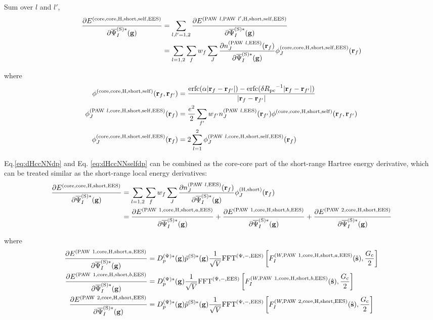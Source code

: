 \documentclass[paper=a4, fontsize=11pt]{article} %
\numberwithin{equation}{section} %
\numberwithin{figure}{section} %
\numberwithin{table}{section} %
\newcommand{\p}{\partial}
\newcommand{\bg}{{\bf{g}}}
\newcommand{\br}{{\bf{r}}}
\newcommand{\hs}{{\hat{\bf{s}}}}
\newcommand{\rS}{{\mathrm{S}}}
\newcommand{\rEES}{{\mathrm{EES}}}
\newcommand{\rcore}{{\mathrm{core}}}
\newcommand{\rself}{{\mathrm{self}}}
\newcommand{\rshort}{{\mathrm{short}}}
\newcommand{\rerfc}{{\mathrm{erfc}}}
\newcommand{\rP}{{\mathrm{PAW}}}
\newcommand{\rH}{{\mathrm{H}}}
\newcommand{\psigsc}{{\overline \Psi_I^{(\rS)*}(\bg)}}
\newcommand{\hGc}{{\frac{G_{\mathrm{c}}}{2}}}
\newcommand{\Rpc}{{R_{\mathrm{pc}}}}
\newcommand{\Dpgc}{{D^{(\Psi)*}_p(\bg)}}
\newcommand{\FFTpiEES}{{\mathrm{FFT}^{(\Psi,-,\rEES)}}}
\begin{document}
Sum over $l$ and $l'$,
\begin{equation}\label{eq:dHccNNselfdp}
\begin{split}
\frac{\p E^{(\rcore,\rcore,\rH,\rshort,\rself,\rEES)}} {\p \psigsc}&=\sum_{l,l'=1,2}\frac{\p E^{(\rP\ l,\rP\ l',\rH,\rshort,\rself,\rEES)}}{\p \psigsc} \\
&= \sum_{l=1,2}\sum_{f} w_f \sum_J \frac{\p n_J^{(\rP\ l,\rEES)}(\br_f) }{\p \psigsc}\phi_J^{(\rcore,\rcore,\rH,\rshort,\rself,\rEES)}(\br_f) \\
\end{split}
\end{equation}


where
\begin{equation}
\begin{split}
\phi^{(\rcore,\rcore,\rH,\rshort,\rself)}(\br_f,\br_{f'})&=\frac{\rerfc(\alpha|\br_f-\br_{f'}|)-\rerfc(\delta \Rpc^{-1}|\br_f-\br_{f'}|)}{|\br_f-\br_{f'}|}\\
\phi_J^{(\rP\ l,\rcore,\rH,\rshort,\rself,\rEES)}(\br_f) & = \frac{e^2}{2}\sum_{f'} w_{f'} n_J^{(\rP\ l,\rEES)}(\br_{f'})\phi^{(\rcore,\rcore,\rH,\rshort,\rself)}(\br_f,\br_{f'}) \\
\phi_J^{(\rcore,\rcore,\rH,\rshort,\rself,\rEES)}(\br_f) &= 2\sum_{l=1}^2\phi_J^{(\rP\ l,\rcore,\rH,\rshort,\rself,\rEES)}(\br_f)
\end{split}
\end{equation}

Eq.\eqref{eq:dHccNNdp} and Eq. \eqref{eq:dHccNNselfdp} can be combined as the core-core part of the short-range Hartree energy derivative, which can be treated similar as the short-range local energy derivatives:
\begin{equation}
\begin{split}
\frac{\p E^{(\rcore,\rcore,\rH,\rshort,\rEES)}} {\p \psigsc}
&= \sum_{l=1,2}\sum_{f} w_f \sum_J \frac{\p n_J^{(\rP\ l,\rEES)}(\br_f) }{\p \psigsc}\phi_{J}^{(\rH,\rshort)}(\br_f) \\
&= \frac{\p E^{(\rP\ 1,\rcore,\rH,\rshort,a,\rEES)}}{\p \psigsc} + \frac{\p E^{(\rP\ 1,\rcore,\rH,\rshort,b,\rEES)}}{\p \psigsc}+ \frac{\p E^{(\rP\ 2,\rcore,\rH,\rshort,\rEES)}}{\p \psigsc}\\
\end{split}
\end{equation}


where
\begin{equation}
\begin{split}
\frac{\p E^{(\rP\ 1,\rcore,\rH,\rshort,a,\rEES)}}{\p \psigsc}
&= \Dpgc \tilde p^{(\rS)*}(\bg)\frac{1}{\sqrt{V}} \FFTpiEES \left[F_I^{(W,\rP\ 1,\rcore,\rH,\rshort,a,\rEES)}(\hs),\hGc\right]\\
\frac{\p E^{(\rP\ 1,\rcore,\rH,\rshort,b,\rEES)}}{\p \psigsc} 
&= \Dpgc \frac{1}{\sqrt V} \FFTpiEES \left[F_I^{(W,\rP\ 1,\rcore,\rH,\rshort,b,\rEES)}(\hs),\hGc\right] \\
\frac{\p E^{(\rP\ 2,\rcore,\rH,\rshort,\rEES)}}{\p \psigsc}
&= \Dpgc\tilde p^{(\rS)*}(\bg)\frac{1}{\sqrt{V}}\FFTpiEES \left[F_I^{(W,\rP\ 2,\rcore,\rH,\rshort,\rEES)}(\hs),\hGc\right] \\
\end{split}
\end{equation}
\end{document}
